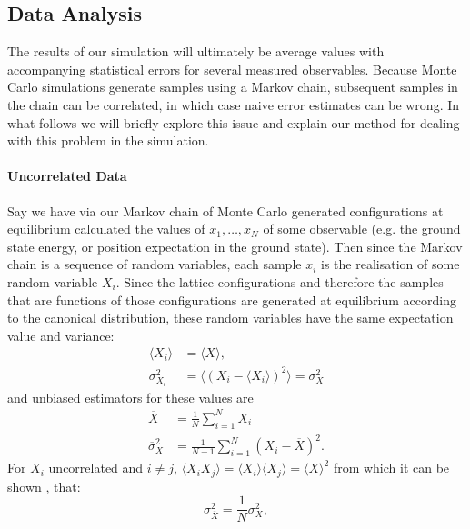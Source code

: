 \documentclass[12pt]{article}
\begin{document}
            \subsection{Data Analysis}
            The results of our simulation will ultimately be average values with accompanying statistical errors for several measured observables. Because Monte Carlo simulations generate samples using a Markov chain, subsequent samples in the chain can be correlated, in which case naive error estimates can be wrong. In what follows we will briefly explore this issue and explain our method for dealing with this problem in the simulation.

            \paragraph{Uncorrelated Data}
            Say we have via our Markov chain of Monte Carlo generated configurations at equilibrium calculated the values of $x_1,\dots,x_N$ of some observable (e.g. the ground state energy, or position expectation in the ground state). Then since the Markov chain is a sequence of random variables, each sample $x_i$ is the realisation of some random variable $X_i$. Since the lattice configurations and therefore the samples that are functions of those configurations are generated at equilibrium according to the canonical distribution, these random variables have the same expectation value and variance:
            \begin{align}
                \langle X_i \rangle & = \langle X \rangle, \\
                \sigma^2_{X_i} & = \langle \left(X_i-\langle X_i\rangle\right)^2 \rangle = \sigma_X^2
            \end{align}
            and unbiased estimators for these values are \cite{gattringer_lang_2013}
            \begin{align}
                \overline{X} & = \frac{1}{N}\sum_{i=1}^{N} X_i \\
                \overline{\sigma}_X^2 & = \frac{1}{N-1}\sum_{i=1}^N\left(X_i-\overline{X}\right)^2.
            \end{align}
            For $X_i$ uncorrelated and $i\neq j$, $\langle X_iX_j \rangle = \langle X_i \rangle \langle X_j \rangle = \langle X \rangle^2$ from which it can be shown \cite{gattringer_lang_2013}, that:
            \begin{equation}
                \label{eq:sdRelation1}
                \sigma^2_{\overline{X}} = \frac{1}{N}\sigma^2_X,
            \end{equation}
\end{document}
